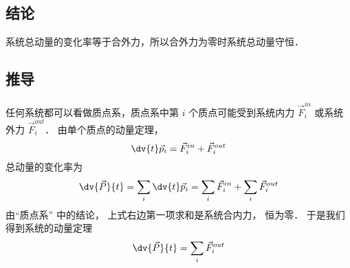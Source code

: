 
\subsection{结论}
系统总动量的变化率等于合外力，所以合外力为零时系统总动量守恒．

\subsection{推导}
任何系统都可以看做质点系，质点系中第 $i$ 个质点可能受到系统内力 $\vec F_i^{in}$ 或系统外力 $\vec F_i^{out}$． 由单个质点的动量定理，
\begin{equation}
\dv{t}\vec p_i = \vec F_i^{in} + \vec F_i^{out}
\end{equation}
总动量的变化率为
\begin{equation}
\dv{\vec P}{t} = \sum_i {\dv{t} \vec p_i}  = \sum_i {\vec F_i^{in}}  + \sum_i \vec F_i^{out}
\end{equation}
由“质点系” 中的结论， 上式右边第一项求和是系统合内力， 恒为零． 于是我们得到系统的动量定理
\begin{equation}
\dv{\vec P}{t} = \sum_i \vec F_i^{out}
\end{equation}

